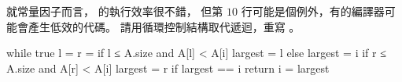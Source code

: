 \startEXERCISE
就常量因子而言，  的執行效率很不錯，
但第 $10$ 行可能是個例外，有的編譯器可能會產生低效的代碼。
請用循環控制結構取代遞迴，重寫 。
\stopEXERCISE

\startANSWER
{}
\startCLRSCODE
while true
	l = 
	r = 
	if l ≤ A.size and A[l] < A[i]
		largest = l
	else
		largest = i
	if r ≤ A.size and A[r] < A[i]
		largest = r
	if largest == i
		return
	i = largest
\stopCLRSCODE
\stopANSWER
